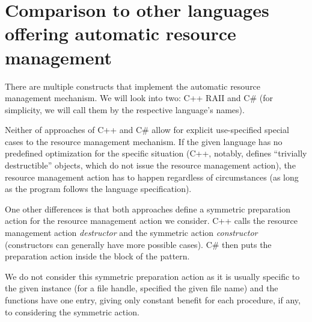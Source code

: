 \section{Comparison to other languages offering automatic resource management}
\label{sec:OtherRAII}

There are multiple constructs that implement the automatic resource management mechanism. We will look into two: C++ RAII and C\#  (for simplicity, we will call them by the respective language's names).

Neither of approaches of C++ and C\# allow for explicit use-specified special cases to the resource management mechanism. If the given language has no predefined optimization for the specific situation (C++, notably, defines ``trivially destructible'' objects, which do not issue the resource management action), the resource management action has to happen regardless of circumstances (as long as the program follows the language specification).

One other differences is that both approaches define a symmetric preparation action for the resource management action we consider. C++ calls the resource management action \emph{destructor} and the symmetric action \emph{constructor} (constructors can generally have more possible cases). C\# then puts the preparation action inside the  block of the pattern.

We do not consider this symmetric preparation action as it is usually specific to the given instance (for a file handle, specified the given file name) and the functions have one entry, giving only constant benefit for each procedure, if any, to considering the symmetric action.
